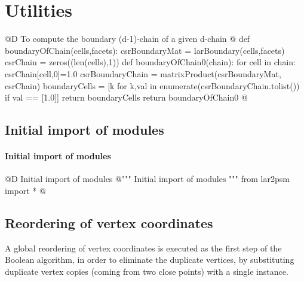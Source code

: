 \documentclass[11pt,oneside]{article}	%
\begin{document}
\appendix
\section{Utilities}

@D To compute the boundary (d-1)-chain of a given d-chain
@{
def boundaryOfChain(cells,facets):
	csrBoundaryMat = larBoundary(cells,facets)
	csrChain = zeros((len(cells),1))
	def boundaryOfChain0(chain):
		for cell in chain:  csrChain[cell,0]=1.0
		csrBoundaryChain = matrixProduct(csrBoundaryMat, csrChain)
		boundaryCells = [k for k,val in enumerate(csrBoundaryChain.tolist()) 
							if val == [1.0]]
		return boundaryCells
	return boundaryOfChain0
@}


\subsection{Initial import of modules}

\paragraph{Initial import of modules}

@D Initial import of modules
@{""" Initial import of modules """
from lar2psm import *
@}

\subsection{Reordering of vertex coordinates}

A global reordering of vertex coordinates is executed as the first step of the Boolean algorithm, in order to eliminate the duplicate vertices, by substituting duplicate vertex copies (coming from two close points) with a single instance. 
\end{document}
